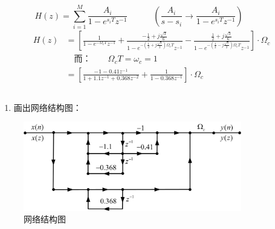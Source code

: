 \documentclass[notheorems,compress,mathserif,table]{beamer}
\begin{document}


\begin{frame}[shrink]\frametitle{}%
  $$H(z) = \sum_{i=1}^{M}\frac{A_i}{1-e^{s_i T}z^{-1}}\quad\quad\quad
  (\frac{A_i}{s-s_i}\longrightarrow \frac{A_i}{1-e^{s_i T}z^{-1}})\quad\quad\quad$$
  \begin{equation*}
  \begin{split}
  H(z) &= \left[
              \frac{1}{1-e^{-\Omega_c T}z^{-1}}+
              \frac{-\frac{1}{2}+j\frac{\sqrt{3}}{6}}
                  {1-e^{-(\frac{1}{2}+j\frac{\sqrt{3}}{2})\Omega_c T}z^{-1}}-
              \frac{\frac{1}{2}+j\frac{\sqrt{3}}{6}}
                  {1-e^{-(\frac{1}{2}-j\frac{\sqrt{3}}{2})\Omega_c T}z^{-1}}
              \right]\cdot\Omega_c\\
           &\quad   \mbox{而：}\quad\quad \Omega_c T = \omega_c = 1\\
           &= \left[\frac{-1-0.41z^{-1}}{1+1.1z^{-1} + 0.368z^{-2}}+
              \frac{1}{1-0.368z^{-1}}\right]\cdot\Omega_c\\
  \end{split}
  \end{equation*}
  \newline\newline\newline\newline\newline\newline\newline\newline
\end{frame}


\begin{frame}[shrink]\frametitle{}%
   \begin{enumerate}
  \item 画出网络结构图：
   \end{enumerate}
  \begin{figure}[h]
    \centering
    \includegraphics[width=0.85\textwidth]{fig24_example2.jpg}
    \caption{网络结构图}
    \label{}
  \end{figure}
\end{frame}
\end{document}

